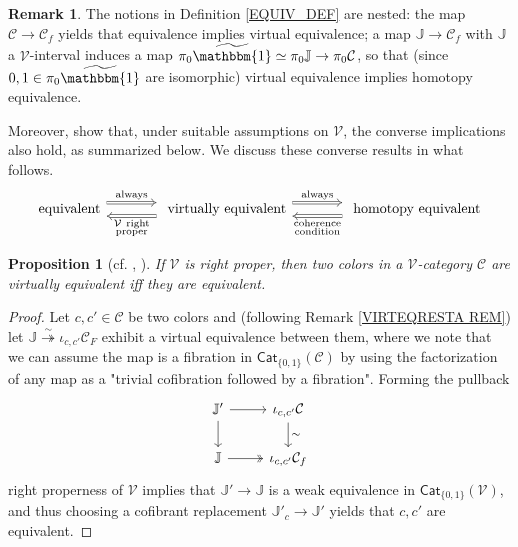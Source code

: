 \documentclass[a4paper,10pt
,draft
]{article}%
\numberwithin{equation}{section}
\numberwithin{figure}{section}
\newtheorem{proposition}[equation]{Proposition}%
\theoremstyle{definition} %
\newtheorem{remark}[equation]{Remark}%
\newcommand{\V}{\ensuremath{\mathcal V}}
\newcommand{\1}{\ensuremath{\mathbbm 1}}%
\begin{document}
\begin{remark}\label{EQUIVNEST_REM}
The notions in Definition \ref{EQUIV_DEF}
are nested: the map $\mathcal{C} \to \mathcal{C}_f$
yields that equivalence implies virtual equivalence;
a map $\mathbb{J} \to \mathcal{C}_f$
with $\mathbb{J}$ a $\mathcal{V}$-interval
induces a map
$\pi_0 \widetilde{\mathbbm{1}} \simeq \pi_0 \mathbb{J} \to \pi_0 \mathcal{C}$,
so that (since $0,1 \in \pi_0 \widetilde{\mathbbm{1}}$ are isomorphic)
virtual equivalence implies homotopy equivalence.

Moreover, \cite{BM13,Cav} show that, under suitable assumptions on $\V$, the converse implications also hold, as summarized below.
We discuss these converse results in what follows.
\begin{equation}\label{BASCOMP EQ}
\begin{tikzcd}[column sep = large]
            \mbox{equivalent}
            \arrow[r, Rightarrow, shift left=2, "\mathrm{always}"]
            &
            \mbox{ virtually equivalent}
            \arrow[r, Rightarrow, shift left=2, "\mathrm{always}"]
            \arrow[l, Rightarrow, shift left = 2, "\substack{$\V\phantom{ }$\mathrm{right} \\ \mathrm{proper}}"]
            &
            \mbox{ homotopy equivalent}
            \arrow[l, Rightarrow, shift left = 2, "\substack{\mathrm{coherence} \\ \mathrm{condition}}"]
\end{tikzcd}
\end{equation}
\end{remark}



\begin{proposition}[{cf. \cite[4.12]{Cav}, \cite[2.10]{BM13}}] \label{RIGHTPROPER PROP}
If $\V$ is right proper, then two colors in a $\V$-category $\mathcal{C}$ are virtually equivalent iff they are equivalent. 
\end{proposition}


\begin{proof}
Let $c,c'\in \mathcal{C}$ be two colors and (following Remark \ref{VIRTEQRESTA REM})
let $\mathbb{J} \overset{\sim}{\twoheadrightarrow} \iota_{c,c'} \mathcal{C}_F$
exhibit a virtual equivalence between them, where we note
that we can assume the map is a fibration in $\mathsf{Cat}_{\{0,1\}}(\mathcal{C})$
by using the factorization of any map as a "trivial cofibration followed by a fibration".
Forming the pullback
\begin{equation}\label{RIGHTPROPER EQ}
\begin{tikzcd}
		 \mathbb{J}' \ar{r} \arrow{d}
	&
		\iota_{c,c'} \mathcal{C} \arrow{d}{\sim}
\\
		\mathbb{J} \ar[twoheadrightarrow]{r} 
	&
		\iota_{c,c'}\mathcal{C}_f
\end{tikzcd}
\end{equation}
right properness of $\V$ implies 
that $\mathbb{J}' \to \mathbb{J}$ is a weak equivalence in 
$\mathsf{Cat}_{\{0,1\}}(\V)$,
and thus choosing a cofibrant replacement
$\mathbb{J}'_c \to \mathbb{J}'$
yields that $c,c'$ are equivalent.
\end{proof}
\end{document}
